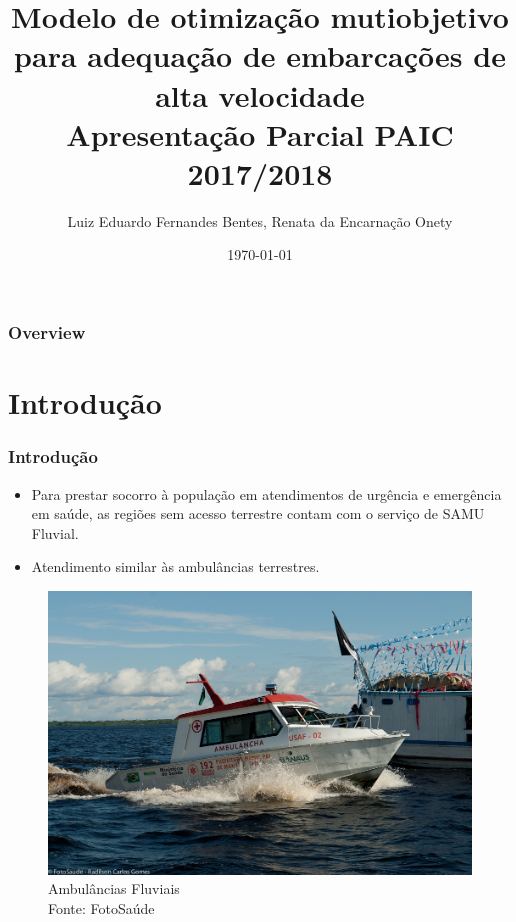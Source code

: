 \documentclass{beamer}
\title[ ]{\textbf{Modelo de otimização mutiobjetivo para adequação de embarcações de alta velocidade}\\Apresentação Parcial PAIC 2017/2018} %
\author[L.E.F.B]{Luiz Eduardo Fernandes Bentes, Renata da Encarnação Onety} %
\institute[UEA] %
{
Universidade do Estado do Amazonas \\ Escola Superior de Tecnologia -- EST\\ Manaus - Amazonas - Brasil\\ %
\medskip
\textit{\{lefb.eng,ronety\} @uea.edu.br} %
}
\date{\today} %
\begin{document}
\begin{frame}
\titlepage %
\end{frame}

\begin{frame}
\frametitle{Overview}
\tableofcontents
\end{frame}

\section{Introdução} 
\begin{frame}
 \tableofcontents[ 
    currentsubsection, 
    hideothersubsections, 
    sectionstyle=show/shaded
    ] 
\end{frame}
\begin{frame}
\frametitle{Introdução}
\begin{itemize}
	\item Para prestar socorro à população em atendimentos de urgência e emergência em saúde, as regiões sem acesso terrestre contam com o serviço de SAMU Fluvial.
	\item Atendimento similar às ambulâncias terrestres.
\end{itemize}

\begin{figure}[h]
	\centering
	\includegraphics[scale=0.7]{samu17}
	\caption{Ambulâncias Fluviais\\Fonte: FotoSaúde}
	\label{fig:ambulancha}
\end{figure}

\end{frame}
\end{document}
